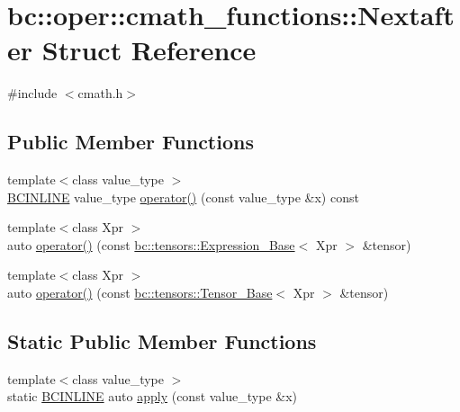 \hypertarget{structbc_1_1oper_1_1cmath__functions_1_1Nextafter}{}\section{bc\+:\+:oper\+:\+:cmath\+\_\+functions\+:\+:Nextafter Struct Reference}
\label{structbc_1_1oper_1_1cmath__functions_1_1Nextafter}


{\ttfamily \#include $<$cmath.\+h$>$}

\subsection*{Public Member Functions}
\begin{DoxyCompactItemize}
\item 
{\footnotesize template$<$class value\+\_\+type $>$ }\\\hyperlink{common_8h_a6699e8b0449da5c0fafb878e59c1d4b1}{B\+C\+I\+N\+L\+I\+NE} value\+\_\+type \hyperlink{structbc_1_1oper_1_1cmath__functions_1_1Nextafter_a03bc931cde3eed4a7e629b365fe6405d}{operator()} (const value\+\_\+type \&x) const
\item 
{\footnotesize template$<$class Xpr $>$ }\\auto \hyperlink{structbc_1_1oper_1_1cmath__functions_1_1Nextafter_a02a6b7704c68b48836fa4229d2b8b37a}{operator()} (const \hyperlink{classbc_1_1tensors_1_1Expression__Base}{bc\+::tensors\+::\+Expression\+\_\+\+Base}$<$ Xpr $>$ \&tensor)
\item 
{\footnotesize template$<$class Xpr $>$ }\\auto \hyperlink{structbc_1_1oper_1_1cmath__functions_1_1Nextafter_abe670b72eb6f97b3208a16aa3e8ea99e}{operator()} (const \hyperlink{classbc_1_1tensors_1_1Tensor__Base}{bc\+::tensors\+::\+Tensor\+\_\+\+Base}$<$ Xpr $>$ \&tensor)
\end{DoxyCompactItemize}
\subsection*{Static Public Member Functions}
\begin{DoxyCompactItemize}
\item 
{\footnotesize template$<$class value\+\_\+type $>$ }\\static \hyperlink{common_8h_a6699e8b0449da5c0fafb878e59c1d4b1}{B\+C\+I\+N\+L\+I\+NE} auto \hyperlink{structbc_1_1oper_1_1cmath__functions_1_1Nextafter_a9f2fd32054c92927a9c6bb230ca24e31}{apply} (const value\+\_\+type \&x)
\end{DoxyCompactItemize}


